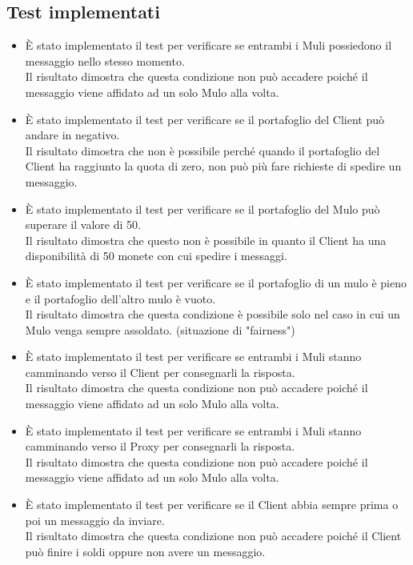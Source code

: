 \documentclass[13pt,a4paper]{article}
\begin{document}
\subsection{Test implementati}
\begin{itemize}
	\item È stato implementato il test per verificare se entrambi i Muli possiedono il messaggio nello stesso momento.\\
	Il risultato dimostra che questa condizione non può accadere poiché il messaggio viene affidato ad un solo Mulo alla volta.
	\item È stato implementato il test per verificare se il portafoglio del Client può andare in negativo.\\
	Il risultato dimostra che non è possibile perché quando il portafoglio del Client ha raggiunto la quota di zero, non può più fare richieste di spedire un messaggio.
	\item È stato implementato il test per verificare se il portafoglio del Mulo può superare il valore di 50.\\
	Il risultato dimostra che questo non è possibile in quanto il Client ha una disponibilità di 50 monete con cui spedire i messaggi. 
	\item È stato implementato il test per verificare se il portafoglio di un mulo è pieno e il portafoglio dell'altro mulo è vuoto. \\
	Il risultato dimostra che questa condizione è possibile solo nel caso in cui un Mulo venga sempre assoldato. (situazione di "fairness")
	\item  È stato implementato il test per verificare se entrambi i Muli stanno camminando verso il Client per consegnarli la risposta.\\
	Il risultato dimostra che questa condizione non può accadere poiché il messaggio viene affidato ad un solo Mulo alla volta.
	\item  È stato implementato il test per verificare se entrambi i Muli stanno camminando verso il Proxy per consegnarli la risposta.\\
	Il risultato dimostra che questa condizione non può accadere poiché il messaggio viene affidato ad un solo Mulo alla volta.
	\item È stato implementato il test per verificare se  il Client abbia sempre prima o poi un messaggio da inviare.\\
	Il risultato dimostra che questa condizione non può accadere poiché il Client può finire i soldi oppure non avere un messaggio.

\end{itemize}
\end{document}
